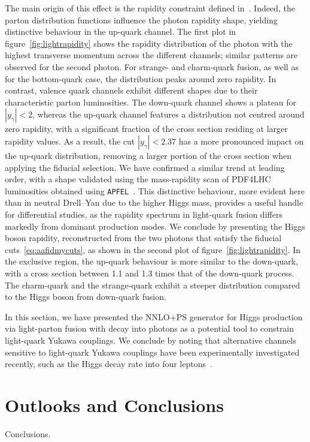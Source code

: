 \documentclass[11pt,a4paper]{article}
\begin{document}
The main origin of this effect is the rapidity constraint defined in~. Indeed, the parton distribution functions influence the photon rapidity shape, yielding distinctive behaviour in the up-quark channel. The first plot in figure~\ref{fig:lightrapidity} shows the rapidity distribution of the photon with the highest transverse momentum across the different channels; similar patterns are observed for the second photon. For strange- and charm-quark fusion, as well as for the bottom-quark case, the distribution peaks around zero rapidity. In contrast, valence quark channels exhibit different shapes due to their characteristic parton luminosities. The down-quark channel shows a plateau for $|y_\gamma| < 2$, whereas the up-quark channel features a distribution not centred around zero rapidity, with a significant fraction of the cross section residing at larger rapidity values. As a result, the cut $|y_\gamma| < 2.37$ has a more pronounced impact on the up-quark distribution, removing a larger portion of the cross section when applying the fiducial selection. We have confirmed a similar trend at leading order, with a shape validated using the mass-rapidity scan of PDF4LHC luminosities obtained using \texttt{APFEL}~\cite{Bertone:2013vaa}. This distinctive behaviour, more evident here than in neutral Drell–Yan due to the higher Higgs mass, provides a useful handle for differential studies, as the rapidity spectrum in light-quark fusion differs markedly from dominant production modes. We conclude by presenting the Higgs boson rapidity, reconstructed from the two photons that satisfy the fiducial cuts~\eqref{eq:aafidmycuts}, as shown in the second plot of figure~\ref{fig:lightrapidity}. In the exclusive region, the up-quark behaviour is more similar to the down-quark, with a cross section between 1.1 and 1.3 times that of the down-quark process. The charm-quark and the strange-quark exhibit a steeper distribution compared to the Higgs boson from down-quark fusion.

In this section, we have presented the NNLO+PS generator for Higgs production via light-parton fusion with decay into photons as a potential tool to constrain light-quark Yukawa couplings. We conclude by noting that alternative channels sensitive to light-quark Yukawa couplings have been experimentally investigated recently, such as the Higgs decay rate into four leptons~\cite{CMS:2025xkn}.
\section{Outlooks and Conclusions}
Conclusions.\\
\end{document}
